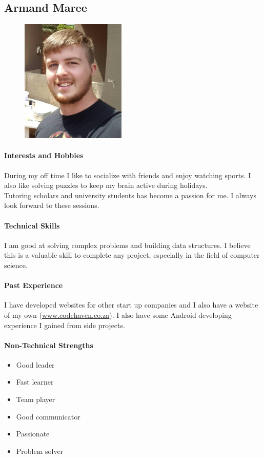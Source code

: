 \documentclass[english]{article}
\begin{document}
		\newpage
		\subsection{Armand Maree}
			\begin{figure}
				\begin{center}
					\includegraphics[width=5cm]{armand.jpg}
				\end{center}
			\end{figure}
			\paragraph{Interests and Hobbies}
			During my off time I like to socialize with friends and enjoy watching sports. I also like solving puzzles to keep my brain active during holidays.\\
			Tutoring scholars and university students has become a passion for me. I always look forward to these sessions.
			
			\paragraph{Technical Skills}
			I am good at solving complex problems and building data structures. I believe this is a valuable skill to complete any project, especially in the field of computer science.
			
			\paragraph{Past Experience}
			I have developed websites for other start up companies and I also have a website of my own (\href{http://www.codehaven.co.za}{www.codehaven.co.za}).
			I also have some Android developing experience I gained from side projects.
			
			\paragraph{Non-Technical Strengths}
			\begin{itemize}
				\setlength\itemsep{0.2em}
				\item Good leader
				\item Fast learner
				\item Team player
				\item Good communicator
				\item Passionate
				\item Problem solver
			\end{itemize}
			
\end{document}
